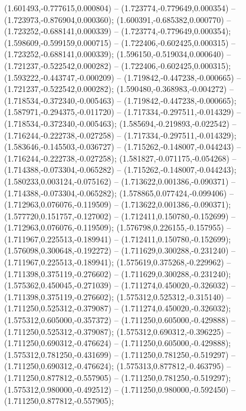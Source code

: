  (1.601493,-0.777615,0.000804) -- (1.723774,-0.779649,0.000354) -- (1.723973,-0.876904,0.000360);
 (1.600391,-0.685382,0.000770) -- (1.723252,-0.688141,0.000339) -- (1.723774,-0.779649,0.000354);
 (1.598609,-0.599159,0.000715) -- (1.722406,-0.602425,0.000315) -- (1.723252,-0.688141,0.000339);
 (1.596150,-0.519034,0.000640) -- (1.721237,-0.522542,0.000282) -- (1.722406,-0.602425,0.000315);
 (1.593222,-0.443747,-0.000209) -- (1.719842,-0.447238,-0.000665) -- (1.721237,-0.522542,0.000282);
 (1.590480,-0.368983,-0.004272) -- (1.718534,-0.372340,-0.005463) -- (1.719842,-0.447238,-0.000665);
 (1.587971,-0.294375,-0.011720) -- (1.717334,-0.297511,-0.014329) -- (1.718534,-0.372340,-0.005463);
 (1.585694,-0.219893,-0.022542) -- (1.716244,-0.222738,-0.027258) -- (1.717334,-0.297511,-0.014329);
 (1.583646,-0.145503,-0.036727) -- (1.715262,-0.148007,-0.044243) -- (1.716244,-0.222738,-0.027258);
 (1.581827,-0.071175,-0.054268) -- (1.714388,-0.073304,-0.065282) -- (1.715262,-0.148007,-0.044243);
 (1.580233,0.003124,-0.075162) -- (1.713622,0.001386,-0.090371) -- (1.714388,-0.073304,-0.065282);
 (1.578865,0.077424,-0.099406) -- (1.712963,0.076076,-0.119509) -- (1.713622,0.001386,-0.090371);
 (1.577720,0.151757,-0.127002) -- (1.712411,0.150780,-0.152699) -- (1.712963,0.076076,-0.119509);
 (1.576798,0.226155,-0.157955) -- (1.711967,0.225513,-0.189941) -- (1.712411,0.150780,-0.152699);
 (1.576098,0.300648,-0.192272) -- (1.711629,0.300288,-0.231240) -- (1.711967,0.225513,-0.189941);
 (1.575619,0.375268,-0.229962) -- (1.711398,0.375119,-0.276602) -- (1.711629,0.300288,-0.231240);
 (1.575362,0.450045,-0.271039) -- (1.711274,0.450020,-0.326032) -- (1.711398,0.375119,-0.276602);
 (1.575312,0.525312,-0.315140) -- (1.711250,0.525312,-0.379087) -- (1.711274,0.450020,-0.326032);
 (1.575312,0.605000,-0.357372) -- (1.711250,0.605000,-0.429888) -- (1.711250,0.525312,-0.379087);
 (1.575312,0.690312,-0.396225) -- (1.711250,0.690312,-0.476624) -- (1.711250,0.605000,-0.429888);
 (1.575312,0.781250,-0.431699) -- (1.711250,0.781250,-0.519297) -- (1.711250,0.690312,-0.476624);
 (1.575313,0.877812,-0.463795) -- (1.711250,0.877812,-0.557905) -- (1.711250,0.781250,-0.519297);
 (1.575312,0.980000,-0.492512) -- (1.711250,0.980000,-0.592450) -- (1.711250,0.877812,-0.557905);
